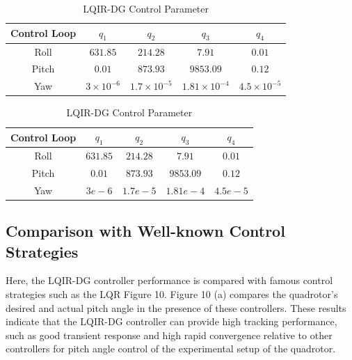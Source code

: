 \documentclass[conference]{IEEEtran}
\begin{document}
\begin{table}[!h]
	\renewcommand{\arraystretch}{1.3}
	\caption{LQIR-DG Control Parameter}
	\begin{center}
	\begin{tabular}{c c c c c}
	\hline
	\textbf{Control Loop} & \textbf{\textit{$q_1$}}& \textbf{\textit{$q_2$}} 
	& \textbf{\textit{$q_3$}} & \textbf{\textit{$q_4$}} \\
	\hline
	Roll & 
	$631.85$ & $214.28$ & $7.91$ &
	$0.01$ \\
	Pitch & 
	$0.01$ & $873.93$ & $9853.09$ &
	$0.12$ \\
	Yaw & 
	$3\times10^{-6}$ & $1.7\times10^{-5}$ & $1.81\times10^{-4}$ &
	$4.5\times10^{-5}$ \\
	\hline
	\end{tabular}
	\label{tab2}
	\end{center}
\end{table}
\begin{table}[!h]
	\renewcommand{\arraystretch}{1.3}
	\caption{LQIR-DG Control Parameter}
	\begin{center}
	\begin{tabular}{c c c c c}
	\hline
	\textbf{Control Loop} & \textbf{\textit{$q_1$}}& \textbf{\textit{$q_2$}} 
	& \textbf{\textit{$q_3$}} & \textbf{\textit{$q_4$}} \\
	\hline
	Roll & 
	$631.85$ & $214.28$ & $7.91$ &
	$0.01$ \\
	Pitch & 
	$0.01$ & $873.93$ & $9853.09$ &
	$0.12$ \\
	Yaw & 
	$3e-6$ & $1.7e-5$ & $1.81e-4$ &
	$4.5e-5$ \\
	\hline
	\end{tabular}
	\label{tab2}
	\end{center}
\end{table}

\subsection{Comparison with Well-known Control Strategies}



Here, the LQIR-DG controller performance is compared with famous control strategies such as the LQR Figure 10. Figure 10 (a) compares the quadrotor's desired and actual pitch angle in the presence of these controllers. These results indicate that the LQIR-DG controller can provide high tracking performance, such as good transient response and high rapid convergence relative to other controllers for pitch angle control of the experimental setup of the quadrotor.
\end{document}
